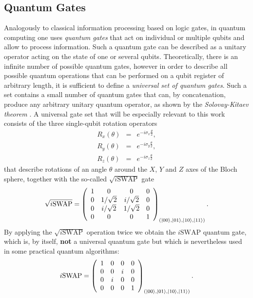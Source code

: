 \subsection{Quantum Gates}

Analogously to classical information processing based on logic gates, in quantum computing one uses {\it quantum gates} that act on individual or multiple qubits and allow to process information. Such a quantum gate can be described as a unitary operator acting on the state of one or several qubits. Theoretically, there is an infinite number of possible quantum gates, however in order to describe all possible quantum operations that can be performed on a qubit register of arbitrary length, it is sufficient to define a {\it universal set of quantum gates}. Such a set contains a small number of quantum gates that can, by concatenation, produce any arbitrary unitary quantum operator, as shown by the {\it Solovay-Kitaev theorem} \citep{nielsen_quantum_2000,dawson_solovay-kitaev_2005}. A universal gate set that will be especially relevant to this work consists of the three single-qubit rotation operators
%
\begin{eqnarray}
   R_x(\theta)  & = & e^{-i\sigma_x\frac{\theta}{2}}, \\ 
   R_y(\theta)  & = & e^{-i\sigma_y\frac{\theta}{2}}, \\ 
   R_z(\theta)  & = & e^{-i\sigma_z\frac{\theta}{2}} 
\label{eq:universal_single_qubit_gates}
\end{eqnarray}
%
that describe rotations of an angle $\theta$ around the $X$, $Y$ and $Z$ axes of the Bloch sphere, together with the so-called $\sqrt{i\mathrm{SWAP}}$ gate
%
\begin{equation}
\sqrt{i\mathrm{SWAP}} = \left( \begin{array}{cccc} 1 & 0 & 0 & 0 \\ 0 & 1/\sqrt{2} & i/\sqrt{2} & 0 \\ 0 & i/\sqrt{2} & 1/\sqrt{2} & 0 \\ 0 & 0 & 0 & 1  \end{array}  \right)_{(\left| 00 \right>,\left| 01 \right>,\left| 10 \right>,\left| 11 \right>)}.
\end{equation}
%
By applying the $\sqrt{i\mathrm{SWAP}}$ operation twice we obtain the $i\mathrm{SWAP}$ quantum gate, which is, by itself, \textbf{not} a universal quantum gate but which is nevertheless used in some practical quantum algorithms:
%
\begin{equation}
i\mathrm{SWAP} = \left( \begin{array}{cccc} 1 & 0 & 0 & 0 \\ 0 & 0 & i & 0 \\ 0 & i & 0 & 0 \\ 0 & 0 & 0 & 1  \end{array}  \right)_{(\left| 00 \right>,\left| 01 \right>,\left| 10 \right>,\left| 11 \right>)}.
\end{equation}
%

